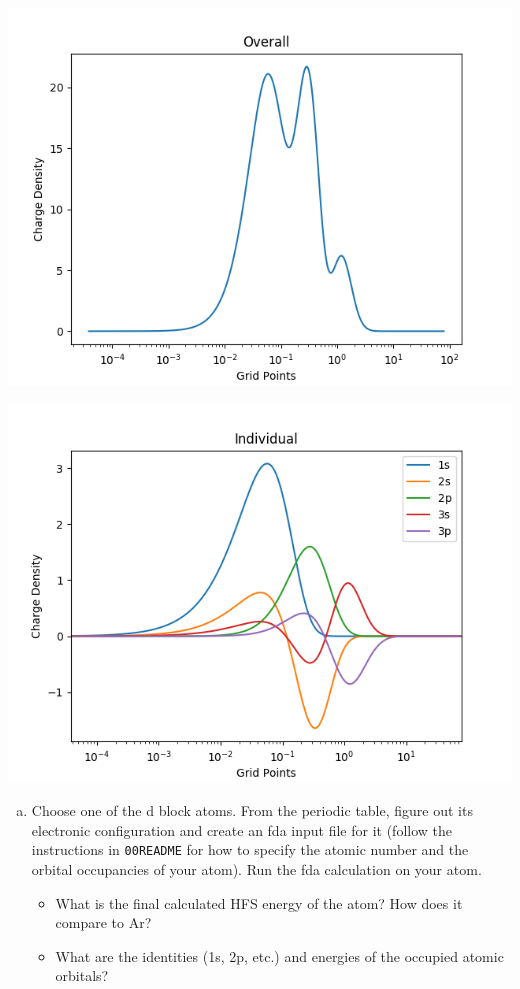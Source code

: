 \documentclass[11pt]{article}
\begin{document}
\begin{center}
\includegraphics[width=.9\linewidth]{./Ar-overall-charge-density.png}
\end{center}
\begin{center}
\includegraphics[width=.9\linewidth]{./Ar-orbital-charge-density.png}
\end{center}

\begin{enumerate}[(c)]
\item Choose one of the d block atoms. From the periodic table, figure out its electronic configuration and create an fda input file for it (follow the instructions in \texttt{00README} for how to specify the atomic number and the orbital occupancies of your atom). Run the fda calculation on your atom.

\begin{itemize}
\item What is the final calculated HFS energy of the atom? How does it compare to Ar?

\item What are the identities (1s, 2p, etc.) and energies of the occupied atomic orbitals?
\end{itemize}
\end{enumerate}
\end{document}
